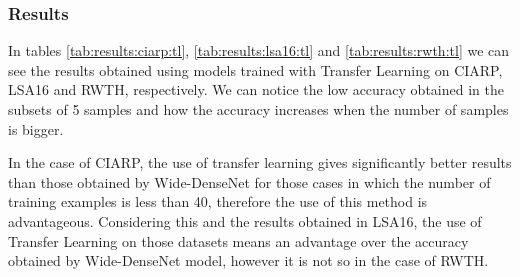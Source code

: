 \subsubsection{Results}

In tables \ref{tab:results:ciarp:tl}, \ref{tab:results:lsa16:tl} and \ref{tab:results:rwth:tl} we can see the results obtained using models trained with Transfer Learning on CIARP, LSA16 and RWTH, respectively. We can notice the low accuracy obtained in the subsets of 5 samples and how the accuracy increases when the number of samples is bigger.

In the case of CIARP, the use of transfer learning gives significantly better results than those obtained by Wide-DenseNet for those cases in which the number of training examples is less than 40, therefore the use of this method is advantageous. Considering this and the results obtained in LSA16, the use of Transfer Learning on those datasets means an advantage over the accuracy obtained by Wide-DenseNet model, however it is not so in the case of RWTH.

